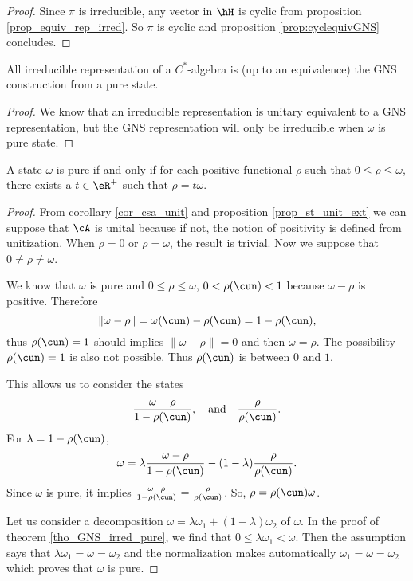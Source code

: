 \begin{proof}
    Since $\pi$ is irreducible, any vector in $\hH$ is cyclic from proposition \ref{prop_equiv_rep_irred}. So $\pi$ is cyclic and proposition \ref{prop:cyclequivGNS} concludes.

\end{proof}

\begin{corollary}
All irreducible representation of a $C^*$-algebra is (up to an equivalence) the GNS construction from a pure state.
\end{corollary}


\begin{proof}
We know that an irreducible representation is unitary equivalent to a GNS representation, but the GNS representation will only be irreducible when $\omega$ is pure state.
\end{proof}


\begin{proposition} 
A state $\omega$ is pure if and only if for each positive functional $\rho$ such that $0\leq \rho\leq\omega$, there exists a $t\in\eR^+$ such that $\rho=t\omega$.
\label{prop_pureiff}
\end{proposition}

\begin{proof}
From corollary \ref{cor_csa_unit} and  proposition \ref{prop_st_unit_ext} we can suppose that $\cA$ is unital because if not, the notion of positivity is defined from unitization. When $\rho=0$ or $\rho=\omega$, the result is trivial. Now we suppose that $0\neq\rho\neq\omega$.


We know that $\omega$ is pure and $0\leq\rho\leq\omega$, $0<\rho(\cun)<1$ because $\omega-\rho$ is positive. Therefore
\[ 
  \| \omega-\rho \|=\omega(\cun)-\rho(\cun)=1-\rho(\cun),
\]
thus $\rho(\cun)=1$ should implies $\| \omega-\rho \|=0$ and then $\omega=\rho$. The possibility $\rho(\cun)=1$ is also not possible. Thus $\rho(\cun)$ is between $0$ and $1$.

This allows us to consider the states
\[ 
  \frac{ \omega-\rho }{ 1-\rho(\cun) },\quad\text{and}\quad\frac{ \rho }{ \rho(\cun) }.
\]
For $\lambda=1-\rho(\cun)$,
\[ 
  \omega=\lambda\frac{ \omega-\rho }{ 1-\rho(\cun) }-(1-\lambda)\frac{ \rho }{ \rho(\cun) }.
\]
Since $\omega$ is pure, it implies $\frac{ \omega-\rho }{ 1-\rho(\cun) }=\frac{ \rho }{ \rho(\cun) }$. So, $\rho=\rho(\cun)\omega$.


Let us consider a decomposition $\omega=\lambda\omega_1+(1-\lambda)\omega_2$ of $\omega$. In the proof of theorem \ref{tho_GNS_irred_pure}, we find that $0\leq\lambda\omega_1<\omega$. Then the assumption says that $\lambda\omega_1=\omega=\omega_2$ and the normalization makes automatically $\omega_1=\omega=\omega_2$ which proves that $\omega$ is pure.

\end{proof}


